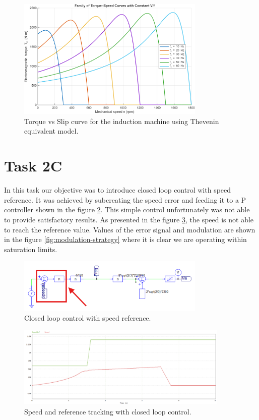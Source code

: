 \documentclass[12pt,a4paper]{report}
\begin{document}
\begin{figure}[H]
    \centering
    \includegraphics[width=0.8\textwidth]{Matlab2b.png}
    \caption{Torque vs Slip curve for the induction machine using Thevenin equivalent model.}
    \label{fig:torque-slip-curve}
\end{figure}
\newpage
\section{Task 2C}
\label{sec:task-2c}

In this task our objective was to introduce closed loop control with speed reference.
It was achieved by subcreating the speed error and feeding it to a P controller shown in the figure \ref{fig:gain-control}.
This simple control unfortunately was not able to provide satisfactory results.
As presented in the figure \ref{fig:speed-torque-closed-loop}, the speed is not able to reach the reference value.
Values of the error signal and modulation are shown in the figure \ref{fig:modulation-strategy} where it is clear we are operating within saturation limits.
\begin{figure}[H]
    \centering
    \includegraphics[width=0.8\textwidth]{GainCtrl.png}
    \caption{Closed loop control with speed reference.}
    \label{fig:gain-control}
\end{figure}

\begin{figure}[H]
    \centering
    \includegraphics[width=0.9\textwidth]{2CSpeed.png}
    \caption{Speed and reference tracking with closed loop control.}
    \label{fig:speed-torque-closed-loop}
\end{figure}
\end{document}
